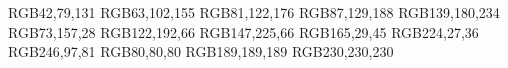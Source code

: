 


\definecolor{blue1}  {RGB}{42,79,131}
\definecolor{blue2}  {RGB}{63,102,155}
\definecolor{blue3}  {RGB}{81,122,176}
\definecolor{blue4}  {RGB}{87,129,188}
\definecolor{blue5}  {RGB}{139,180,234}
\definecolor{green1} {RGB}{73,157,28}
\definecolor{green2} {RGB}{122,192,66}
\definecolor{green3} {RGB}{147,225,66}
\definecolor{red1}   {RGB}{165,29,45}
\definecolor{red2}   {RGB}{224,27,36}
\definecolor{red3}   {RGB}{246,97,81}
\definecolor{grey1}  {RGB}{80,80,80}
\definecolor{b1grau} {RGB}{189,189,189}
\definecolor{grey2}  {RGB}{230,230,230}
